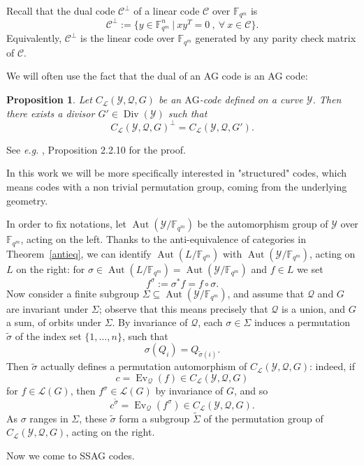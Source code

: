 \documentclass[10pt]{article}
\newtheorem{prop1}[thm]{Proposition}
\theoremstyle{definition}
\theoremstyle{definition}
\theoremstyle{definition}
\newcommand{\Fqm}{\mathbb{F}_{q^m}}
\newcommand{\su}{\subseteq}
\newcommand{\Y}{\mathcal{Y}}
\newcommand{\QR}{\mathcal{Q}}
\newcommand{\Div}{\operatorname{Div}}
\newcommand{\Aut}{\operatorname{Aut}}
\newcommand{\calL}{\mathcal{L}}
\begin{document}
Recall that the dual code $\mathcal{C}^{\perp}$ of a
linear code $\mathcal{C}$ over $\Fqm$ is
\[\mathcal{C}^{\perp} := \{ y \in \Fqm^n \ | \ xy^T = 0 \ , \ \forall \ x \in \mathcal{C}\}.\]
Equivalently, $\mathcal{C}^{\perp}$ is the linear code over $\Fqm$ generated by any parity check matrix of $\mathcal{C}$.

We will often use the fact that the dual of an AG code is an AG code:

\begin{prop1} \label{dual}
Let $C_{\calL}(\Y,\QR,G)$ be an $\mathrm{AG}$-code defined on a curve $\Y$. Then there exists a divisor $G' \in \Div(\Y)$ such that 
\[C_{\calL}(\Y,\QR,G)^{\perp} = C_{\calL}(\Y,\QR,G').\]
\end{prop1}
See \emph{e.g.} \cite{Sti}, Proposition 2.2.10 for the proof.

In this work we will be more specifically interested in "structured" codes, which means codes with a non trivial permutation group, coming from the underlying geometry.

In order to fix notations, let $\Aut(\Y/\Fqm)$ be the automorphism group of $\Y$ over $\Fqm$, acting on the left.
Thanks to the anti-equivalence of categories in Theorem~\ref{antieq},
we can identify $\Aut(L/\Fqm)$ with $\Aut(\Y/\Fqm)$, acting on $L$ on the right:
for $\sigma\in\Aut(L/\Fqm)=\Aut(\Y/\Fqm)$ and $f\in L$ we set
$$f^\sigma:=\sigma^*f=f\circ\sigma.$$
Now consider a finite subgroup $\Sigma\su\Aut(\Y/\Fqm)$,
and assume that $\QR$ and $G$ are invariant under $\Sigma$;
observe that this means precisely that $\QR$ is a union, and $G$ a sum, of orbits under $\Sigma$.
By invariance of $\QR$, each $\sigma\in\Sigma$ induces a permutation $\tilde{\sigma}$ of the index set $\{1,\dots,n\}$, such that
$$\sigma(Q_i)=Q_{\tilde{\sigma}(i)}.$$
Then $\tilde{\sigma}$ actually defines a permutation automorphism of $C_{\calL}(\Y,\QR,G)$: indeed, if
$$c=\operatorname{Ev}_{\QR}(f)\in C_{\calL}(\Y,\QR,G)$$
for $f\in\calL(G)$, then $f^\sigma\in\calL(G)$ by invariance of $G$, and so
$$c^{\tilde{\sigma}}=\operatorname{Ev}_{\QR}(f^\sigma)\in C_{\calL}(\Y,\QR,G).$$
As $\sigma$ ranges in $\Sigma$, these $\tilde{\sigma}$ form a subgroup $\tilde{\Sigma}$ of the permutation group of $C_{\calL}(\Y,\QR,G)$, acting on the right.
 
Now we come to SSAG codes.
\end{document}
